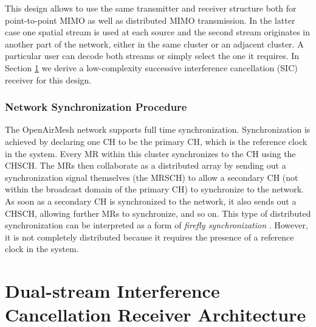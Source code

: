 \documentclass[a4paper,twocolumn,journal]{IEEEtran}
\begin{document}
This design allows to use the same transmitter and receiver structure both for point-to-point MIMO as well as distributed MIMO transmission. In the latter case one spatial stream is used at each source and the second stream originates in another part of the network, either in the same cluster or an adjacent cluster.  A particular user can decode both streams or simply select the one it requires. In Section \ref{sec:ic} we derive a low-complexity successive interference cancellation (SIC) receiver for this design. 


\subsubsection{Network Synchronization Procedure}
\label{sec:sync}

The OpenAirMesh network supports full time synchronization. Synchronization is achieved by declaring one CH to be the primary CH, which is the reference clock in the system. Every MR within this cluster synchronizes to the CH using the CHSCH. The MRs then collaborate as a distributed array by sending out a synchronization signal themselves (the MRSCH) to allow a secondary CH (not within the broadcast domain of the primary CH) to synchronize to the network. As soon as a secondary CH is synchronized to the network, it also sends out a CHSCH, allowing further MRs to synchronize, and so on.  This type of distributed synchronization can be interpreted as a form of {\em firefly synchronization} \cite{tyrell06fireflies,hu06scalability}. However, it is not completely distributed because it requires the presence of a reference clock in the system. 


% 

\section{Dual-stream Interference Cancellation Receiver Architecture}
\label{sec:ic}
\end{document}
